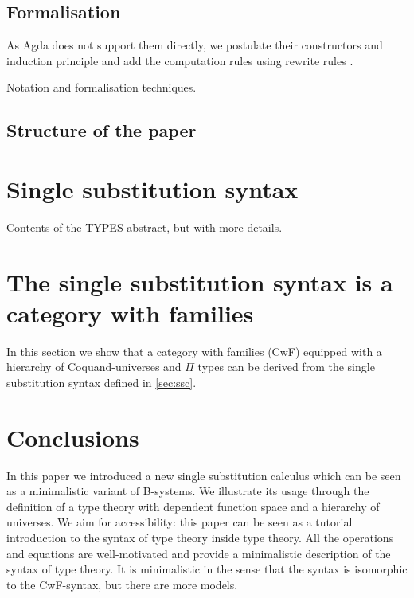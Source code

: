 \documentclass[sigplan,10pt,anonymous,review]{acmart}\settopmatter{printfolios=true,printccs=false,printacmref=false}
\begin{document}

\subsection{Formalisation}

As Agda does not support them directly, we postulate their
constructors and induction principle and add the computation rules
using rewrite rules \cite{DBLP:conf/types/Cockx19}.

Notation and formalisation techniques.

\subsection{Structure of the paper}

\section{Single substitution syntax}
\label{sec:ssc}

Contents of the TYPES abstract, but with more details.

\section{The single substitution syntax is a category with families}

In this section we show that a category with families (CwF) equipped
with a hierarchy of Coquand-universes and $\Pi$ types can be derived
from the single substitution syntax defined in \autoref{sec:ssc}.

\section{Conclusions}
\label{sec:conclusion}

In this paper we introduced a new single substitution calculus which
can be seen as a minimalistic variant of B-systems. We illustrate its
usage through the definition of a type theory with dependent function
space and a hierarchy of universes. We aim for accessibility: this
paper can be seen as a tutorial introduction to the syntax of type
theory inside type theory. All the operations and equations are
well-motivated and provide a minimalistic description of the syntax of
type theory. It is minimalistic in the sense that the syntax is
isomorphic to the CwF-syntax, but there are more models. 
\end{document}
